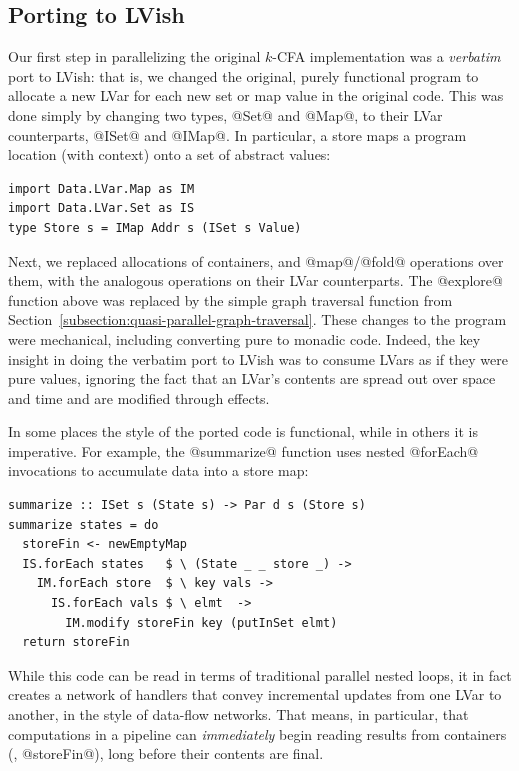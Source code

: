 \subsection{Porting to LVish}

Our first step in parallelizing the original $k$-CFA implementation
was a \emph{verbatim} port to LVish: that is, we changed the original,
purely functional program to allocate a new LVar for each new set or
map value in the original code.  This was done simply by changing two
types, @Set@ and @Map@, to their LVar counterparts, @ISet@ and @IMap@.
In particular, a store maps a program location (with context) onto a
set of abstract values:

\singlespacing
\begin{lstlisting}
import Data.LVar.Map as IM
import Data.LVar.Set as IS
type Store s = IMap Addr s (ISet s Value)
\end{lstlisting}
\doublespacing

Next, we replaced allocations of containers, and @map@/@fold@
operations over them, with the analogous operations on their LVar
counterparts.  The @explore@ function above was replaced by the simple
graph traversal function from
Section~\ref{subsection:quasi-parallel-graph-traversal}.  These
changes to the program were mechanical, including converting pure to
monadic code.  Indeed, the key insight in doing the verbatim port to
LVish was to consume LVars as if they were pure values, ignoring the
fact that an LVar's contents are spread out over space and time and
are modified through effects.

In some places the style of the ported code is functional, while in
others it is imperative.  For example, the @summarize@ function uses
nested @forEach@ invocations to accumulate data into a store map:

\singlespacing
\begin{lstlisting}
summarize :: ISet s (State s) -> Par d s (Store s)
summarize states = do
  storeFin <- newEmptyMap
  IS.forEach states   $ \ (State _ _ store _) -> 
    IM.forEach store  $ \ key vals -> 
      IS.forEach vals $ \ elmt  -> 
        IM.modify storeFin key (putInSet elmt)
  return storeFin    
\end{lstlisting}
\doublespacing

While this code can be read in terms of traditional parallel nested
loops, it in fact creates a network of handlers that convey
incremental updates from one LVar to another, in the style of
data-flow networks.  That means, in particular, that computations in a
pipeline can \emph{immediately} begin reading results from containers
(\eg, @storeFin@), long before their contents are final.

